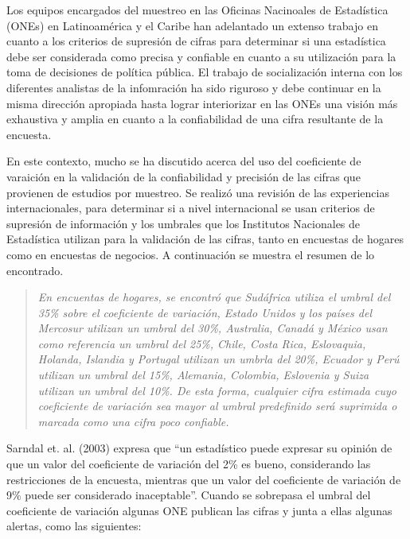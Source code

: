\documentclass[12pt,spanish,]{book}
\begin{document}
Los equipos encargados del muestreo en las Oficinas Nacinoales de Estadística (ONEs) en Latinoamérica y el Caribe han adelantado un extenso trabajo en cuanto a los criterios de supresión de cifras para determinar si una estadística debe ser considerada como precisa y confiable en cuanto a su utilización para la toma de decisiones de política pública. El trabajo de socialización interna con los diferentes analistas de la infomración ha sido riguroso y debe continuar en la misma dirección apropiada hasta lograr interiorizar en las ONEs una visión más exhaustiva y amplia en cuanto a la confiabilidad de una cifra resultante de la encuesta.

En este contexto, mucho se ha discutido acerca del uso del coeficiente de varaición en la validación de la confiabilidad y precisión de las cifras que provienen de estudios por muestreo. Se realizó una revisión de las experiencias internacionales, para determinar si a nivel internacional se usan criterios de supresión de información y los umbrales que los Institutos Nacionales de Estadística utilizan para la validación de las cifras, tanto en encuestas de hogares como en encuestas de negocios. A continuación se muestra el resumen de lo encontrado.

\begin{quote}
\emph{En encuentas de hogares, se encontró que Sudáfrica utiliza el umbral del 35\% sobre el coeficiente de variación, Estado Unidos y los países del Mercosur utilizan un umbral del 30\%, Australia, Canadá y México usan como referencia un umbral del 25\%, Chile, Costa Rica, Eslovaquia, Holanda, Islandia y Portugal utilizan un umbrla del 20\%, Ecuador y Perú utilizan un umbral del 15\%, Alemania, Colombia, Eslovenia y Suiza utilizan un umbral del 10\%. De esta forma, cualquier cifra estimada cuyo coeficiente de variación sea mayor al umbral predefinido será suprimida o marcada como una cifra poco confiable.}
\end{quote}

Sarndal et. al. (2003) expresa que ``un estadístico puede expresar su opinión de que un valor del coeficiente de variación del 2\% es bueno, considerando las restricciones de la encuesta, mientras que un valor del coeficiente de variación de 9\% puede ser considerado inaceptable''. Cuando se sobrepasa el umbral del coeficiente de variación algunas ONE publican las cifras y junta a ellas algunas alertas, como las siguientes:
\end{document}
